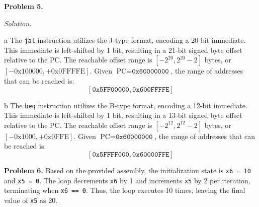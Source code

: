 \documentclass[11pt]{article}
\newcommand{\problem}[1]{\vspace{0.5em}\noindent\textbf{Problem #1.}\vspace{0.3em}}
\newenvironment{solution}{\par\noindent\textit{Solution.}}{\par\vspace{1em}}
\begin{document}
\problem{5}
\begin{solution}
    \begin{subproblem}{a}
        The \texttt{jal} instruction utilizes the J-type format, encoding a 20-bit immediate. This immediate is left-shifted by 1 bit, resulting in a 21-bit signed byte offset relative to the PC.
        The reachable offset range is $[-2^{20}, 2^{20}-2]$ bytes, or $[-0\text{x}100000, +0\text{x}0\text{FFFFE}]$.
        Given $\text{PC} = \texttt{0x60000000}$, the range of addresses that can be reached is:
        \[ [\texttt{0x5FF00000}, \texttt{0x600FFFFE}] \]
    \end{subproblem}

    \begin{subproblem}{b}
        The \texttt{beq} instruction utilizes the B-type format, encoding a 12-bit immediate. This immediate is left-shifted by 1 bit, resulting in a 13-bit signed byte offset relative to the PC.
        The reachable offset range is $[-2^{12}, 2^{12}-2]$ bytes, or $[-0\text{x}1000, +0\text{x}0\text{FFE}]$.
        Given $\text{PC} = \texttt{0x60000000}$, the range of addresses that can be reached is:
        \[ [\texttt{0x5FFFF000}, \texttt{0x60000FFE}] \]
    \end{subproblem}
\end{solution}  

\problem{6}
Based on the provided assembly, the initialization state is \texttt{x6 = 10} and \texttt{x5 = 0}. The loop decrements \texttt{x6} by 1 and increments \texttt{x5} by 2 per iteration, terminating when \texttt{x6 == 0}. Thus, the loop executes 10 times, leaving the final value of \texttt{x5} as 20.
\end{document}
